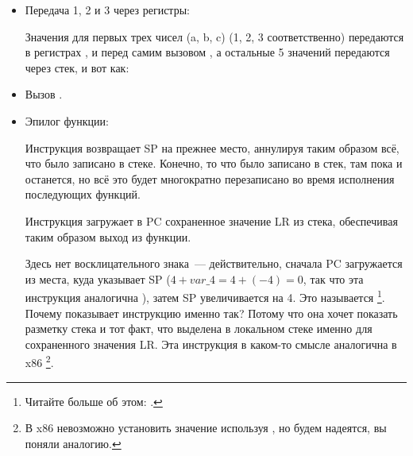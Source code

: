 \begin{itemize}
\item Передача 1, 2 и 3 через регистры:

Значения для первых трех чисел (a, b, c) (1, 2, 3 соответственно) передаются в регистрах 
,  и  перед самим вызовом \printf, а остальные 5 значений передаются через стек, и вот как:

\item Вызов \printf.

\item Эпилог функции:

Инструкция  возвращает \ac{SP} на прежнее место, 
аннулируя таким образом всё, что было записано в стеке.
Конечно, то что было записано в стек, там пока и останется, но всё это будет многократно 
перезаписано во время исполнения последующих функций.

Инструкция  загружает в \ac{PC} 
сохраненное значение \ac{LR} из стека, обеспечивая таким образом выход из функции.

Здесь нет восклицательного знака~--- действительно, сначала \ac{PC} загружается из места, куда указывает \ac{SP}
($4+var\_4=4+(-4)=0$, так что эта инструкция аналогична ), затем \ac{SP} увеличивается 
на 4.
Это называется \footnote{Читайте больше об этом: .}.
Почему \IDA показывает инструкцию именно так?
Потому что она хочет показать разметку стека и тот факт, что  выделена в локальном стеке именно для сохраненного
значения \ac{LR}.
Эта инструкция в каком-то смысле аналогична  в x86
\footnote{В x86 невозможно установить значение  используя \POP, но будем надеятся, вы поняли аналогию.}.

\end{itemize}

\subsubsectionold{\OptimizingKeilVI: \ThumbMode}

